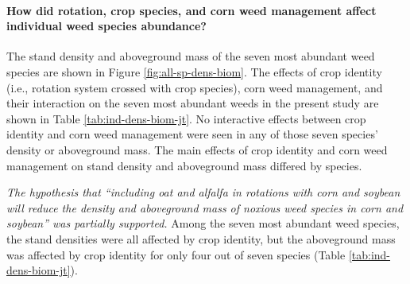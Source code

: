 \documentclass[
]{article}
\begin{document}
\hypertarget{how-did-rotation-crop-species-and-corn-weed-management-affect-individual-weed-species-abundance}{%
\paragraph*{How did rotation, crop species, and corn weed management affect individual weed species abundance?}\label{how-did-rotation-crop-species-and-corn-weed-management-affect-individual-weed-species-abundance}}

The stand density and aboveground mass of the seven most abundant weed species are shown in Figure \ref{fig:all-sp-dens-biom}. The effects of crop identity (i.e., rotation system crossed with crop species), corn weed management, and their interaction on the seven most abundant weeds in the present study are shown in Table \ref{tab:ind-dens-biom-jt}.
No interactive effects between crop identity and corn weed management were seen in any of those seven species' density or aboveground mass. The main effects of crop identity and corn weed management on stand density and aboveground mass differed by species.

\emph{The hypothesis that ``including oat and alfalfa in rotations with corn and soybean will reduce the density and aboveground mass of noxious weed species in corn and soybean'' was partially supported.} Among the seven most abundant weed species, the stand densities were all affected by crop identity, but the aboveground mass was affected by crop identity for only four out of seven species (Table \ref{tab:ind-dens-biom-jt}).
\end{document}
